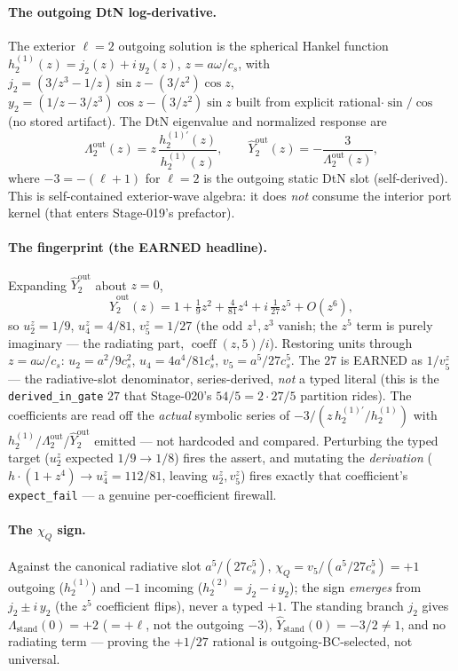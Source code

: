\paragraph{The outgoing DtN log-derivative.}
The exterior \(\ell=2\) outgoing solution is the spherical Hankel function
\(h_2^{(1)}(z)=j_2(z)+i\,y_2(z)\), \(z=a\omega/c_s\), with
\(j_2=(3/z^3-1/z)\sin z-(3/z^2)\cos z\),
\(y_2=(1/z-3/z^3)\cos z-(3/z^2)\sin z\) built from explicit rational\(\cdot\sin/\cos\)
(no stored artifact). The DtN eigenvalue and normalized response are
\[
  \Lambda_2^{\mathrm{out}}(z)=z\,\frac{h_2^{(1)\prime}(z)}{h_2^{(1)}(z)},
  \qquad
  \hat Y_2^{\mathrm{out}}(z)=-\frac{3}{\Lambda_2^{\mathrm{out}}(z)},
\]
where \(-3=-(\ell+1)\) for \(\ell=2\) is the outgoing static DtN slot (self-derived).
This is self-contained exterior-wave algebra: it does \emph{not} consume the interior
port kernel (that enters Stage-019's prefactor).

\paragraph{The fingerprint (the EARNED headline).}
Expanding \(\hat Y_2^{\mathrm{out}}\) about \(z=0\),
\[
  \hat Y_2^{\mathrm{out}}(z)=1+\tfrac19 z^2+\tfrac{4}{81} z^4+i\,\tfrac1{27} z^5+O(z^6),
\]
so \(u_2^z=1/9\), \(u_4^z=4/81\), \(v_5^z=1/27\) (the odd \(z^1,z^3\) vanish; the \(z^5\)
term is purely imaginary --- the radiating part, \(\operatorname{coeff}(z,5)/i\)).
Restoring units through \(z=a\omega/c_s\):
\(u_2=a^2/9c_s^2\), \(u_4=4a^4/81c_s^4\), \(v_5=a^5/27c_s^5\). The \(27\) is EARNED as
\(1/v_5^z\) --- the radiative-slot denominator, series-derived, \emph{not} a typed literal
(this is the \texttt{derived\_in\_gate} \(27\) that Stage-020's \(54/5=2\cdot27/5\) partition
rides). The coefficients are read off the \emph{actual} symbolic series of
\(-3/(z\,h_2^{(1)\prime}/h_2^{(1)})\) with \(h_2^{(1)}\)/\(\Lambda_2^{\mathrm{out}}\)/\(\hat Y_2^{\mathrm{out}}\)
emitted --- not hardcoded and compared. Perturbing the typed target
(\(u_2^z\) expected \(1/9\to1/8\)) fires the assert, and mutating the \emph{derivation}
(\(h\cdot(1+z^4)\to u_4^z=112/81\), leaving \(u_2^z,v_5^z\)) fires exactly that coefficient's
\texttt{expect\_fail} --- a genuine per-coefficient firewall.

\paragraph{The \texorpdfstring{\(\chi_Q\)}{chi\_Q} sign.}
Against the canonical radiative slot \(a^5/(27c_s^5)\),
\(\chi_Q=v_5/(a^5/27c_s^5)=+1\) outgoing (\(h_2^{(1)}\)) and \(-1\) incoming
(\(h_2^{(2)}=j_2-i\,y_2\)); the sign \emph{emerges} from \(j_2\pm i\,y_2\) (the \(z^5\)
coefficient flips), never a typed \(+1\). The standing branch \(j_2\) gives
\(\Lambda_{\mathrm{stand}}(0)=+2\) (\(=+\ell\), not the outgoing \(-3\)),
\(\hat Y_{\mathrm{stand}}(0)=-3/2\ne1\), and no radiating term --- proving the \(+1/27\)
rational is outgoing-BC-selected, not universal.

